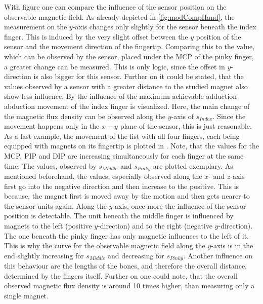 With figure  one can compare the influence of the sensor position on the observable magnetic field. As already depicted in \ref{fig:modCompHand}, the measurement on the $ y $-axis changes only slightly for the sensor beneath the index finger. This is induced by the very slight offset between the $ y $ position of the sensor and the movement direction of the fingertip. Comparing this to the value, which can be observed by the sensor, placed under the \ac{MCP} of the pinky finger, a greater change can be measured. This is only logic, since the offset in $ y $-direction is also bigger for this sensor. Further on it could be stated, that the values observed by a sensor with a greater distance to the studied magnet also show less influence. By  the influence of the maximum achievable adduction-abduction movement of the index finger is visualized. Here, the main change of the magnetic flux density can be observed along the $ y $-axis of $ s_{Index} $. Since the movement happens only in the $ x-y $ plane of the sensor, this is just reasonable. As a last example, the movement of the fist with all four fingers, each being equipped with magnets on its fingertip is plotted in . Note, that the values for the \ac{MCP}, \ac{PIP} and \ac{DIP} are increasing simultaneously for each finger at the same time. The values, observed by $ s_{Middle} $ and $ s_{Pinky} $ are plotted exemplary. As mentioned beforehand, the values, especially observed along the $ x $- and $ z $-axis first go into the negative direction and then increase to the positive. This is because, the magnet first is moved \grqq away \grqq by the motion and then gets nearer to the sensor units again. Along the $ y $-axis, once more the influence of the sensor position is detectable. The unit beneath the middle finger is influenced by magnets to the left (positive $ y $-direction) and to the right (negative $ y $-direction). The one beneath the pinky finger has only magnetic influences to the left of it. This is why the curve for the observable magnetic field along the $ y $-axis is in the end slightly increasing for $ s_{Middle} $ and decreasing for $ s_{Pinky} $. Another influence on this behaviour are the lengths of the bones, and therefore the overall distance, determined by the fingers itself. Further on one could note, that the overall observed magnetic flux density is around 10 times higher, than measuring only a single magnet.

